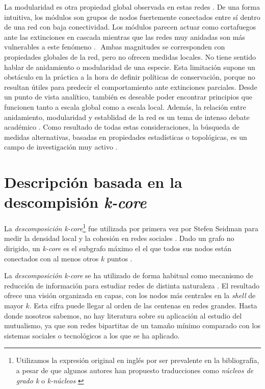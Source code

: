 La modularidad es otra propiedad global observada en estas redes \cite{newman2004finding, olesen2007modularity}. De una forma intuitiva, los módulos son grupos de nodos fuertemente conectados entre sí dentro de una red con baja conectividad. Los módulos parecen actuar como cortafuegos ante las extinciones en cascada \cite{saavedra2011strong} mientras que las redes muy anidadas son más vulnerables a este fenómeno \cite{lever2014sudden}. 
$  $
Ambas magnitudes se corresponden con propiedades globales de la red, pero no ofrecen medidas locales. No tiene sentido hablar de anidamiento o modularidad de una especie. Esta limitación supone un obstáculo en la práctica a la hora de definir políticas de conservación, porque no resultan útiles para predecir el comportamiento ante extinciones parciales. Desde un punto de vista analítico, también es deseable poder encontrar principios que funcionen tanto a escala global como a escala local. 
Además, la relación entre anidamiento, modularidad y establidad de la red es un tema de intenso debate académico \cite{fortuna2010nestedness, james2012disentangling, staniczenko2013ghost, feng2014heterogeneity}. Como resultado de todas estas consideraciones, la búsqueda de medidas alternativas, basadas en propiedades estadísticas o topológicas, es un campo de investigación muy activo \cite{podani2014new,chagnon2015characterizing,strona2015new}.

\section{Descripción basada en la descompisión \textit{k-core}}

La \textit{descomposición k-core}\footnote{Utilizamos la expresión original en inglés por ser prevalente en la bibliografía, a pesar de que algunos autores han propuesto traducciones como \textit{núcleos de grado k} \cite{herrero2000terminologia} o \textit{k-núcleos} \cite{cardona2006taxonomia, martinez2011aplicacion}} fue utilizada por primera vez por Stefen Seidman para medir la densidad local y la cohesión en redes sociales \cite{seidman1983network}. Dado un grafo no dirigido, un \textit{k-core} es el subgrafo máximo el el que todos sus nodos están conectados con al menos otros $k$ puntos \cite{dorogovtsev2006k}.

La \textit{descomposición k-core} se ha utilizado de forma habitual como mecanismo de reducción de información para estudiar redes de distinta naturaleza \cite{kitsak2010identification, zhang2010using, barbera2015critical}. El resultado ofrece una visión organizada en capas, con los nodos más centrales en la \textit{shell} de mayor $k$. Esta cifra puede llegar al orden de las centenas en redes grandes. Hasta donde nosotros sabemos, no hay literatura sobre su aplicación al estudio del mutualismo, ya que son redes bipartitas de un tamaño mínimo comparado con los sistemas sociales o tecnológicos a los que se ha aplicado.

